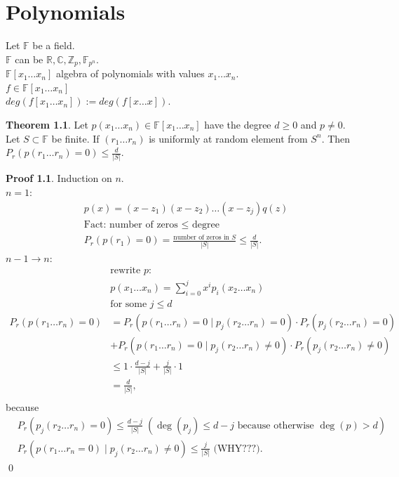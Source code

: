 \documentclass[a4paper, 12pt]{book}
\theoremstyle{definition}
\newtheorem{theorem}[counter]{Theorem}
\newtheorem{pro}[counter]{Proof}
\theoremstyle{remark}
\newcommand{\Z}{\mathbb{Z}}
\newcommand{\R}{\mathbb{R}}
\newcommand{\C}{\mathbb{C}}
\newcommand{\F}{\mathbb{F}}
\begin{document}
\chapter{Polynomials}


Let $\F$ be a field. \\
$\F$ can be $\R, \C, \Z_p, \F_{p^n}$. \\
$\F[x_1 \dots x_n]$ algebra of polynomials with values $x_1 \dots x_n$. \\
$f \in \F[x_1 \dots x_n]$ \\
$deg(f[x_1 \dots x_n]) := deg(f[x \dots x])$.
\begin{theorem}
  Let $p(x_1 \dots x_n) \in \F[x_1 \dots x_n]$ have the degree $d \geq 0$ and $p \neq 0$.
  Let $S \subset \F$ be finite.
  If $(r_1 \dots r_n)$ is uniformly at random element from $S^n$.
  Then $P_r(p(r_1 \dots r_n) = 0) \leq \frac{d}{|S|}$.
\end{theorem}
\begin{pro}
  Induction on $n$. \\
  $n=1$:
  \begin{align*}
    &p(x) = (x-z_1) (x-z_2) \dots (x-z_j) q(z) \\
    &\text{Fact: number of zeros } \leq \text{ degree} \\
    &P_r(p(r_1) = 0) = \frac{\text{number of zeros in }S}{|S|} \leq \frac{d}{|S|}.
  \end{align*}
  $n-1 \to n$:
  \begin{align*}
    &\text{rewrite }p: \\
    &p(x_1 \dots x_n) = \sum_{i=0}^{j} x^i p_i(x_2 \dots x_n) \\
    &\text{for some }j \leq d \\
    P_r(p(r_1 \dots r_n) = 0) &= P_r(p(r_1 \dots r_n) = 0 \mid p_j(r_2 \dots r_n) = 0) \cdot P_r(p_j(r_2 \dots r_n) = 0) \\
    &+ P_r(p(r_1 \dots r_n) = 0 \mid p_j(r_2 \dots r_n) \neq 0) \cdot P_r(p_j(r_2 \dots r_n) \neq 0) \\
    &\leq 1 \cdot \frac{d-j}{|S|} + \frac{j}{|S|} \cdot 1 \\
    &= \frac{d}{|S|}, \\
  \end{align*}
  because
  \begin{align*}
    &P_r(p_j(r_2 \dots r_n) = 0) \leq \frac{d-j}{|S|}\; (\deg(p_j) \leq d - j \text{ because otherwise }\deg(p) > d) \\
    &P_r(p(r_1 \dots r_n = 0) \mid p_j(r_2 \dots r_n) \neq 0) \leq \frac{j}{|S|}\text{ (WHY???)}.
  \end{align*}
  \qed
\end{pro}
\end{document}
